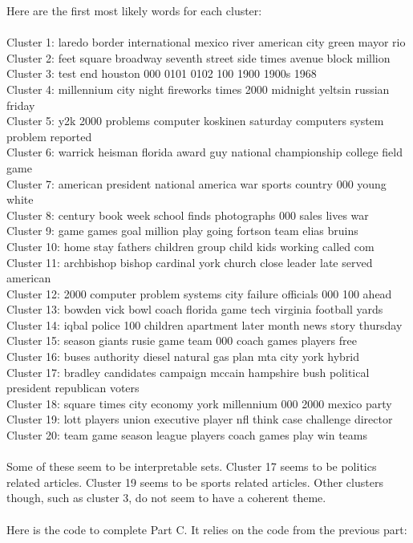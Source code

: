 \documentclass[twoside,11pt]{article}
\theoremstyle{definition}
\begin{document}
Here are the first most likely words for each cluster:\\
\\
Cluster 1: laredo border international mexico river american city green mayor rio \\
Cluster 2: feet square broadway seventh street side times avenue block million \\
Cluster 3: test end houston 000 0101 0102 100 1900 1900s 1968 \\
Cluster 4: millennium city night fireworks times 2000 midnight yeltsin russian friday \\
Cluster 5: y2k 2000 problems computer koskinen saturday computers system problem reported \\
Cluster 6: warrick heisman florida award guy national championship college field game \\
Cluster 7: american president national america war sports country 000 young white \\
Cluster 8: century book week school finds photographs 000 sales lives war \\
Cluster 9: game games goal million play going fortson team elias bruins \\
Cluster 10: home stay fathers children group child kids working called com\\ 
Cluster 11: archbishop bishop cardinal york church close leader late served american \\
Cluster 12: 2000 computer problem systems city failure officials 000 100 ahead \\
Cluster 13: bowden vick bowl coach florida game tech virginia football yards \\
Cluster 14: iqbal police 100 children apartment later month news story thursday\\ 
Cluster 15: season giants rusie game team 000 coach games players free \\
Cluster 16: buses authority diesel natural gas plan mta city york hybrid \\
Cluster 17: bradley candidates campaign mccain hampshire bush political president republican voters \\
Cluster 18: square times city economy york millennium 000 2000 mexico party \\
Cluster 19: lott players union executive player nfl think case challenge director \\
Cluster 20: team game season league players coach games play win teams \\
\\
Some of these seem to be interpretable sets. Cluster 17 seems to be politics related articles. Cluster 19 seems to be sports related articles. Other clusters though, such as cluster 3, do not seem to have a coherent theme. \\
\\
Here is the code to complete Part C. It relies on the code from the previous part: \\

\end{document}
